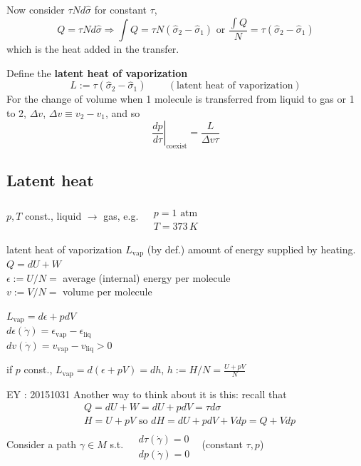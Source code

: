 Now consider $\tau N d\widehat{\sigma}$ for constant $\tau$, 
\[
Q = \tau N d\widehat{\sigma} \Longrightarrow \int Q = \tau N( \widehat{\sigma}_2 - \widehat{\sigma}_1) \text{ or } \frac{ \int Q}{ N} = \tau (\widehat{\sigma}_2 - \widehat{\sigma}_1 ) 
\]
which is the heat added in the transfer.  

Define the \textbf{latent heat of vaporization}
\begin{equation}
  L := \tau(\widehat{\sigma}_2 - \widehat{\sigma}_1) \qquad \, (\text{latent heat of vaporization})
\end{equation}
For the change of volume when 1 molecule is transferred from liquid to gas or 1 to 2, $\Delta v$, $\Delta v \equiv v_2 - v_1$, and so 
\begin{equation}
\left. \frac{dp}{d\tau } \right|_{\text{coexist}} = \frac{L }{ \Delta v \tau}
\end{equation}


\subsection{Latent heat}

$p,T$ const., liquid $\to $ gas, e.g. $ \begin{aligned} & \quad \\
  & p = 1 \text{ atm } \\
  & T = 373 \, K \end{aligned}$

latent heat of vaporization $L_{\text{vap}}$ (by def.) amount of energy supplied by heating.  \\
$Q = dU + W$ \\
$\epsilon := U/N = $ average (internal) energy per molecule  \\
$v:= V/N = $ volume per molecule 

$L_{\text{vap}} = d\epsilon + p dV$ \\
\phantom{\quad \, } $d\epsilon(\dot{\gamma}) = \epsilon_{\text{vap}} - \epsilon_{\text{liq}}$ \\
\phantom{\quad \, } $dv(\dot{\gamma}) = v_{\text{vap}} - v_{\text{liq}} >0$

if $p$ const., $L_{\text{vap}} = d(\epsilon + pV) = dh$, $h:= H/N = \frac{ U + pV}{N}$

EY : 20151031 Another way to think about it is this: recall that
\[
\begin{aligned}
  & Q = dU + W = dU + pdV = \tau d\sigma \\ 
  & H = U + pV \text{ so } dH = dU + pdV + Vdp = Q + Vdp
\end{aligned}
\]
Consider a path $\gamma \in M$ s.t. $\begin{aligned} & \quad \\
  & d\tau(\dot{\gamma}) = 0 \\
  & dp(\dot{\gamma}) = 0 \end{aligned}$ \quad \, (constant $\tau,p$)

